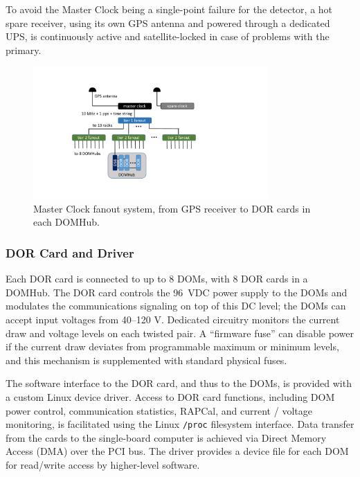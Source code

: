 To avoid the Master Clock being a single-point failure for the detector, a
hot spare receiver, using its own GPS antenna and powered through a
dedicated UPS, is continuously active and satellite-locked in case of problems with
the primary.

\begin{figure}[!ht]
 \centering
 \includegraphics[width=0.8\textwidth]{graphics/online/data_readout/clock_fanout.pdf}
 \caption{Master Clock fanout system, from GPS receiver to DOR cards in
   each DOMHub.}
 \label{fig:clock_fanout}
\end{figure}


\subsubsection{DOR Card and Driver}

Each DOR card is connected to up to 8 DOMs, with 8 DOR cards in a
DOMHub. The DOR card controls the 96~VDC power supply to the DOMs and
modulates the communications signaling on top of this DC level; the DOMs
can accept input voltages from 40--120 V.
Dedicated circuitry monitors the current draw and voltage levels on each
twisted pair. A ``firmware fuse'' can disable power if the current draw
deviates from programmable maximum or minimum levels, and this mechanism is
supplemented with standard physical fuses.  

The software interface to the DOR card, and thus to the DOMs, is provided
with a custom Linux device driver.  Access to DOR card functions, including
DOM power control, communication statistics, RAPCal, and current / voltage
monitoring, is facilitated using the Linux \texttt{/proc} filesystem
interface.  Data transfer from the cards to the single-board computer is
achieved via Direct Memory Access (DMA) over the PCI bus.  The driver
provides a device file for each DOM for read/write access by higher-level software.

